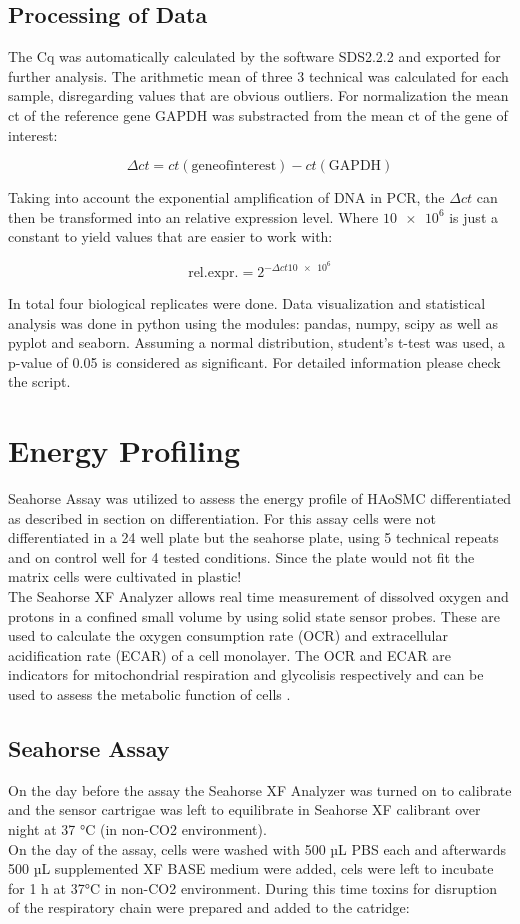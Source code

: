     \subsection{Processing of Data}
    The Cq was automatically calculated by the software SDS2.2.2 and exported for further analysis. The arithmetic  mean of three 3 technical was calculated for each sample, disregarding values that are obvious outliers. For normalization the mean ct of the reference gene GAPDH was substracted from the mean ct of the gene of interest:

    $$\Delta ct = ct(\mathrm{gene of interest}) - ct(\mathrm{GAPDH})$$

    Taking into account the exponential amplification of DNA in PCR, the $\Delta ct$ can then be transformed into an relative expression level. Where $\num{10e6}$ is just a constant to yield values that are easier to work with:

    $$\mathrm{rel. expr.} = 2^{-\Delta ct\num{10e6}}$$

    In total four biological replicates were done. Data visualization and statistical analysis was done in python using the modules: pandas, numpy, scipy as well as pyplot and seaborn. Assuming a normal distribution, student's t-test was used, a p-value of 0.05 is considered as significant. For detailed information please check the script.

\section{Energy Profiling}
\label{sec:seahorse}
Seahorse Assay was utilized to assess the energy profile of HAoSMC differentiated as described in section on differentiation. For this assay cells were not differentiated in a 24 well plate but the seahorse plate, using 5 technical repeats and on control well for 4 tested conditions. Since the plate would not fit the matrix cells were cultivated in plastic!\\
The Seahorse XF Analyzer allows real time measurement of dissolved oxygen and protons in a confined small volume by using solid state sensor probes. These are used to calculate the oxygen consumption rate (OCR) and extracellular acidification rate (ECAR) of a cell monolayer. The OCR and ECAR are indicators for mitochondrial respiration and glycolisis respectively and can be used to assess the metabolic function of cells \cite{HowAgilentSeahorse}.

    \subsection{Seahorse Assay}
    On the day before the assay the Seahorse XF Analyzer was turned on to calibrate and the sensor cartrigae was left to equilibrate in Seahorse XF calibrant over night at 37 °C (in non-CO2 environment).\\
    On the day of the assay, cells were washed with 500 µL PBS each and afterwards 500 µL supplemented XF BASE medium were added, cels were left to incubate for 1 h at 37°C in non-CO2 environment. During this time toxins for disruption of the respiratory chain were prepared and added to the catridge:

